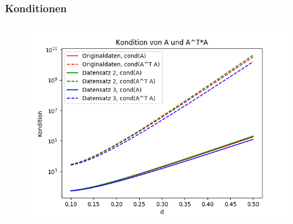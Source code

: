 \documentclass[a4paper, 11pt]{beamer}
\begin{document}
\begin{frame}
\end{frame}


\begin{frame}
    \frametitle{Konditionen}

    \begin{figure}
        \centering
        \includegraphics[scale=0.6]{kondition}
    \end{figure}
\end{frame}
\end{document}
